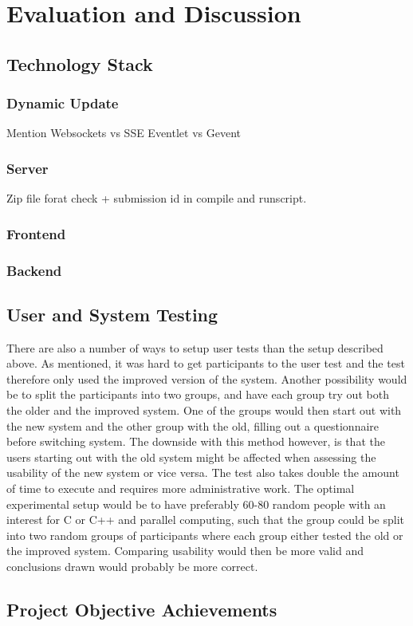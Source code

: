 \chapter{Evaluation and Discussion}

\section{Technology Stack}
\label{sec:eval-tech}

\subsection{Dynamic Update}
Mention Websockets vs SSE
Eventlet vs Gevent

\subsection{Server}
Zip file forat check + submission id in compile and runscript.

\subsection{Frontend}

\subsection{Backend}

\section{User and System Testing}
There are also a number of ways to setup user tests than the setup described above. As mentioned, it was hard to get participants to the user test and the test therefore only used the improved version of the system. Another possibility would be to split the participants into two groups, and have each group try out both the older and the improved system. One of the groups would then start out with the new system and the other group with the old, filling out a questionnaire before switching system. The downside with this method however, is that the users starting out with the old system might be affected when assessing the usability of the new system or vice versa. The test also takes double the amount of time to execute and requires more administrative work. The optimal experimental setup would be to have preferably 60-80 random people with an interest for C or C++ and parallel computing, such that the group could be split into two random groups of participants where each group either tested the old or the improved system. Comparing usability would then be more valid and conclusions drawn would probably be more correct.

\section{Project Objective Achievements}
